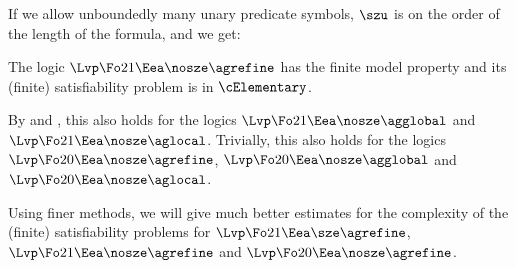 If we allow unboundedly many unary predicate symbols, $\szu$ is on the order of
the length of the formula, and we get:
\begin{proposition}
The logic $\Lvp\Fo21\Eea\nosze\agrefine$ has the finite model property and its
(finite) satisfiability problem is in $\cElementary$.

By  and ,
this also holds for the logics $\Lvp\Fo21\Eea\nosze\agglobal$
and $\Lvp\Fo21\Eea\nosze\aglocal$.
Trivially, this also holds for the logics $\Lvp\Fo20\Eea\nosze\agrefine$,
$\Lvp\Fo20\Eea\nosze\agglobal$ and $\Lvp\Fo20\Eea\nosze\aglocal$.
\end{proposition}

Using finer methods, we will give much better estimates for the complexity of
the (finite) satisfiability problems for $\Lvp\Fo21\Eea\sze\agrefine$,
$\Lvp\Fo21\Eea\nosze\agrefine$ and $\Lvp\Fo20\Eea\nosze\agrefine$.